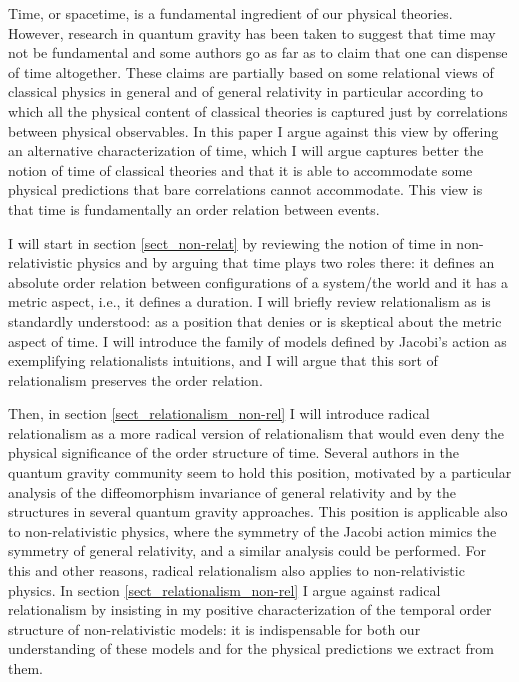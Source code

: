 \documentclass[12 pt]{article}
\begin{document}
Time, or spacetime, is a fundamental ingredient of our physical theories. However, research in quantum gravity has been taken to suggest that time may not be fundamental and some authors \citep{Rovelli2011} go as far as to claim that one can dispense of time altogether. These claims are partially based on some relational views of classical physics in general and of general relativity in particular according to which all the physical content of classical theories is captured just by correlations between physical observables. In this paper I argue against this view by offering an alternative characterization of time, which I will argue captures better the notion of time of classical theories and that it is able to accommodate some physical predictions that bare correlations cannot accommodate. This view is that time is fundamentally an order relation between events.

I will start in section \ref{sect_non-relat} by reviewing the notion of time in non-relativistic physics and by arguing that time plays two roles there: it defines an absolute order relation between configurations of a system/the world and it has a metric aspect, i.e., it defines a duration. I will briefly review relationalism as is standardly understood: as a position that denies or is skeptical about the metric aspect of time. I will introduce the family of models defined by Jacobi's action as exemplifying relationalists intuitions, and I will argue that this sort of relationalism preserves the order relation.

Then, in section \ref{sect_relationalism_non-rel} I will introduce radical relationalism as a more radical version of relationalism that would even deny the physical significance of the order structure of time. Several authors in the quantum gravity community seem to hold this position, motivated by a particular analysis of the diffeomorphism invariance of general relativity and by the structures in several quantum gravity approaches. This position is applicable also to non-relativistic physics, where the symmetry of the Jacobi action mimics the symmetry of general relativity, and a similar analysis could be performed. For this and other reasons, radical relationalism also applies to non-relativistic physics. In section \ref{sect_relationalism_non-rel} I argue against radical relationalism by insisting in my positive characterization of the temporal order structure of non-relativistic models: it is indispensable for both our understanding of these models and for the physical predictions we extract from them.
\end{document}
